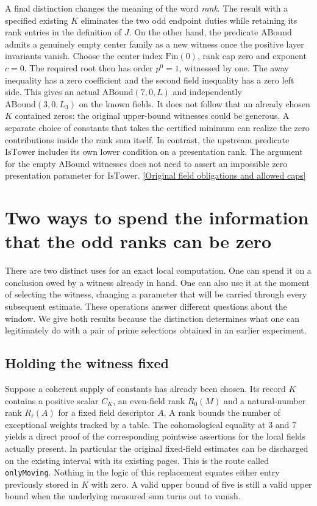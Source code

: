 \documentclass[12pt,letterpaper]{article}
\begin{document}
A final distinction changes the meaning of the word \emph{rank}. The result with a specified existing \(K\) eliminates the two odd endpoint duties while retaining its rank entries in the definition of \(J\). On the other hand, the predicate \(\mathrm{ABound}\) admits a genuinely empty center family as a new witness once the positive layer invariants vanish. Choose the center index \(\mathrm{Fin}(0)\), rank cap zero and exponent \(c=0\). The required root then has order \(p^0=1\), witnessed by one. The away inequality has a zero coefficient and the second field inequality has a zero left side. This gives an actual \(\mathrm{ABound}(7,0,L)\) and independently \(\mathrm{ABound}(3,0,L_3)\) on the known fields. It does not follow that an already chosen \(K\) contained zeros: the original upper-bound witnesses could be generous. A separate choice of constants that takes the certified minimum can realize the zero contributions inside the rank sum itself. In contrast, the upstream predicate \(\mathrm{IsTower}\) includes its own lower condition on a presentation rank. The argument for the empty \(\mathrm{ABound}\) witnesses does not need to assert an impossible zero presentation parameter for \(\mathrm{IsTower}\). \href{https://github.com/nousentllc/riemann-hypothesis/blob/40e56bab026552e089d7afcfeff08d2defb9c005/src/Development/AutomorphicArithmetic/AutomorphicVarieties/LayeredIsomorphisms/SecondBound.lean#L13-L31}{[Original field obligations and allowed caps]}


\section{Two ways to spend the information that the odd ranks can be zero}

There are two distinct uses for an exact local computation. One can spend it on a conclusion owed by a witness already in hand. One can also use it at the moment of selecting the witness, changing a parameter that will be carried through every subsequent estimate. These operations answer different questions about the window. We give both results because the distinction determines what one can legitimately do with a pair of prime selections obtained in an earlier experiment.

\subsection{Holding the witness fixed}
Suppose a coherent supply of constants has already been chosen. Its record \(K\) contains a positive scalar \(C_K\), an even-field rank \(R_0(M)\) and a natural-number rank \(R_\ell(A)\) for a fixed field descriptor \(A\). A rank bounds the number of exceptional weights tracked by a table. The cohomological equality at 3 and 7 yields a direct proof of the corresponding pointwise assertions for the local fields actually present. In particular the original fixed-field estimates can be discharged on the existing interval with its existing pages. This is the route called \texttt{onlyMoving}. Nothing in the logic of this replacement equates either entry previously stored in \(K\) with zero. A valid upper bound of five is still a valid upper bound when the underlying measured sum turns out to vanish.
\end{document}

